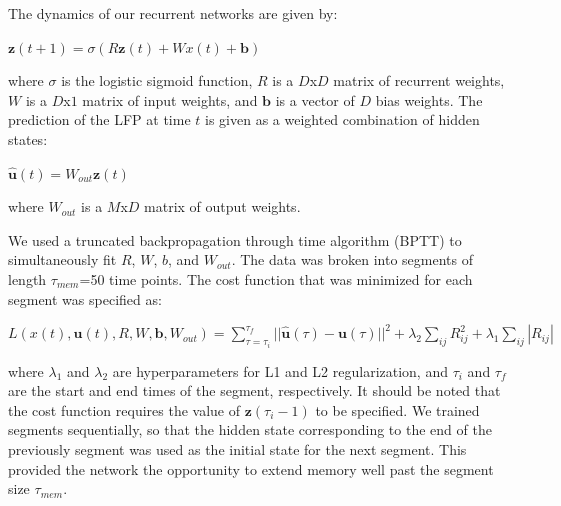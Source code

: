 The dynamics of our recurrent networks are given by:

\begin{center}
$ \textbf{z}(t+1) = \sigma \left( R \textbf{z}(t)  + W x(t) + \textbf{b} \right)$
\end{center}

where $\sigma$ is the logistic sigmoid function, $R$ is a $D$x$D$ matrix of recurrent weights, $W$ is a $D$x$1$ matrix of input weights, and $\textbf{b}$ is a vector of $D$ bias weights. The prediction of the LFP at time $t$ is given as a weighted combination of hidden states:

\begin{center}
$\hat{\textbf{u}}(t) = W_{out} \textbf{z}(t)$
\end{center}

where $W_{out}$ is a $M$x$D$ matrix of output weights.

    We used a truncated backpropagation through time algorithm (BPTT) \cite{Werbos1990} to simultaneously fit $R$, $W$, $b$, and $W_{out}$. The data was broken into segments of length $\tau_{mem}$=50 time points. The cost function that was minimized for each segment was specified as:

\begin{center}
$L(x(t), \textbf{u}(t), R, W, \textbf{b}, W_{out}) = \sum _{\tau = \tau_i} ^{\tau_f} || \hat{\textbf{u}}(\tau) - \textbf{u}(\tau) ||^2 + \lambda_2 \sum _{ij} R_{ij}^2 + \lambda_1 \sum_{ij} |R_{ij}|$
\end{center}

where $\lambda_1$ and $\lambda_2$ are hyperparameters for L1 and L2 regularization, and $\tau_i$ and $\tau_f$ are the start and end times of the segment, respectively. It should be noted that the cost function requires the value of $\textbf{z}(\tau_i - 1)$ to be specified. We trained segments sequentially, so that the hidden state corresponding to the end of the previously segment was used as the initial state for the next segment. This provided the network the opportunity to extend memory well past the segment size $\tau_{mem}$.























